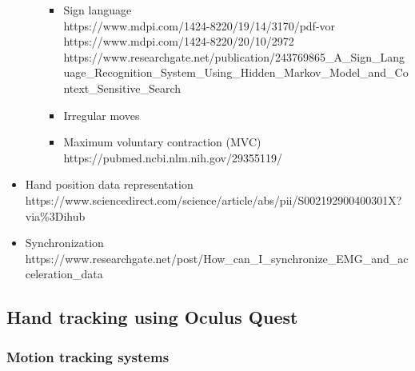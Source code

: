 \documentclass{article}
\begin{document}
\begin{itemize}
\begin{itemize}
\begin{itemize}
            \item Sign language \\
            https://www.mdpi.com/1424-8220/19/14/3170/pdf-vor \\
            https://www.mdpi.com/1424-8220/20/10/2972 \\
            https://www.researchgate.net/publication/243769865\_A\_Sign\_Language\_Recognition\_System\_Using\_Hidden\_Markov\_Model\_and\_Context\_Sensitive\_Search
            \item Irregular moves
            \item Maximum voluntary contraction (MVC) \\
            https://pubmed.ncbi.nlm.nih.gov/29355119/ 
        \end{itemize}
    \end{itemize}
    \item Hand position data representation \\
    https://www.sciencedirect.com/science/article/abs/pii/S002192900400301X?via\%3Dihub
    \item Synchronization \\
    https://www.researchgate.net/post/How\_can\_I\_synchronize\_EMG\_and\_acceleration\_data 
\end{itemize}

\subsection{Hand tracking using Oculus Quest}

\subsubsection{Motion tracking systems}
\end{document}
